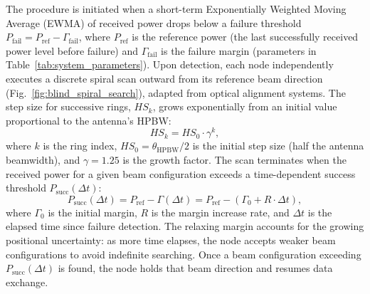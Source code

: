 \documentclass[fleqn,10pt]{wlscirep}
\begin{document}
The procedure is initiated when a short-term Exponentially Weighted Moving Average (EWMA) of received power drops below a failure threshold $P_{\text{fail}} = P_{\text{ref}} - \Gamma_{\text{fail}}$, where $P_{\text{ref}}$ is the reference power (the last successfully received power level before failure) and $\Gamma_{\text{fail}}$ is the failure margin (parameters in Table~\ref{tab:system_parameters}). Upon detection, each node independently executes a discrete spiral scan outward from its reference beam direction (Fig.~\ref{fig:blind_spiral_search}), adapted from optical alignment systems\cite{photonics11060540}. The step size for successive rings, $HS_k$, grows exponentially from an initial value proportional to the antenna's HPBW:
\begin{equation}
    HS_k = HS_0 \cdot \gamma^k,
\end{equation}
where $k$ is the ring index, $HS_0 = \theta_{\text{HPBW}}/2$ is the initial step size (half the antenna beamwidth), and $\gamma = 1.25$ is the growth factor. The scan terminates when the received power for a given beam configuration exceeds a time-dependent success threshold $P_{\text{succ}}(\Delta t)$:
\begin{equation}
    P_{\text{succ}}(\Delta t) = P_{\text{ref}} - \Gamma(\Delta t) = P_{\text{ref}} - (\Gamma_{0} + R \cdot \Delta t),
\end{equation}
where $\Gamma_{0}$ is the initial margin, $R$ is the margin increase rate, and $\Delta t$ is the elapsed time since failure detection. The relaxing margin accounts for the growing positional uncertainty: as more time elapses, the node accepts weaker beam configurations to avoid indefinite searching. Once a beam configuration exceeding $P_{\text{succ}}(\Delta t)$ is found, the node holds that beam direction and resumes data exchange.
\end{document}
